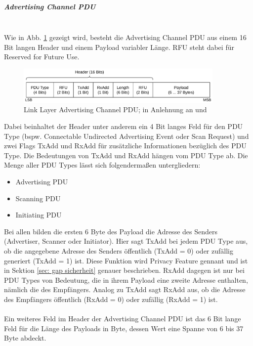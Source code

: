 \subparagraph{Advertising Channel PDU} \mbox{} \vspace{0.2cm} \\
Wie in Abb. \ref{fig: ll adv channel pdu} gezeigt wird, besteht die Advertising Channel PDU aus einem 16 Bit langen Header und einem Payload variabler Länge. RFU steht dabei für Reserved for Future Use.
\begin{figure}[H]
    \centering
    \includegraphics[width=0.9\textwidth]{graphics/link_layer_packetformat_pdu_adv.pdf}
    \caption[Link Layer Advertising Channel PDU]{Link Layer Advertising Channel PDU; in Anlehnung an \cite{BtSpec_fig_2201} und \cite{BtSpec_fig_2202}}
    \label{fig: ll adv channel pdu}
\end{figure}
Dabei beinhaltet der Header unter anderem ein 4 Bit langes Feld für den PDU Type (bspw. Connectable Undirected Advertising Event oder Scan Request) und zwei Flags TxAdd und RxAdd für zusätzliche Informationen bezüglich des PDU Type. Die Bedeutungen von TxAdd und RxAdd hängen vom PDU Type ab. Die Menge aller PDU Types lässt sich folgendermaßen untergliedern:
\begin{itemize}
    \item Advertising PDU
    \item Scanning PDU
    \item Initiating PDU
\end{itemize}
Bei allen bilden die ersten 6 Byte des Payload die Adresse des Senders (Advertiser, Scanner oder Initiator). Hier sagt TxAdd bei jedem PDU Type aus, ob die angegebene Adresse des Senders öffentlich (TxAdd = 0) oder zufällig generiert (TxAdd = 1) ist. Diese Funktion wird Privacy Feature gennant und ist in Sektion \ref{sec: gap sicherheit} genauer beschrieben. RxAdd dagegen ist nur bei PDU Types von Bedeutung, die in ihrem Payload eine zweite Adresse enthalten, nämlich die des Empfängers. Analog zu TxAdd sagt RxAdd aus, ob die Adresse des Empfängers öffentlich (RxAdd = 0) oder zufällig (RxAdd = 1) ist.
\\\\
Ein weiteres Feld im Header der Advertising Channel PDU ist das 6 Bit lange Feld für die Länge des Payloads in Byte, dessen Wert eine Spanne von 6 bis 37 Byte abdeckt. \cite{BtSpec4.0_2201-2208}

